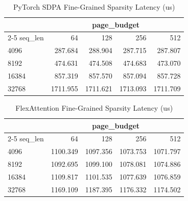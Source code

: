\begin{table}[hbt]
\small
\centering
\caption{PyTorch SDPA Fine-Grained Sparsity Latency (us)}
\label{table:eval-sparsity-torch}
\begin{tabular}{@{}lrrrr@{}}
\toprule
\multicolumn{1}{c}{} & \multicolumn{4}{c}{page\_budget} \\
\cmidrule(l){2-5}
seq\_len & 64 & 128 & 256 & 512 \\
\midrule
4096  & 287.684 & 288.904 & 287.715 & 287.807 \\
8192  & 474.631 & 474.508 & 474.683 & 473.070 \\
16384 & 857.319 & 857.570 & 857.094 & 857.728 \\
32768 & 1711.955 & 1711.621 & 1713.093 & 1711.709 \\
\bottomrule
\end{tabular}
\end{table}

\begin{table}[hbt]
\small
\centering
\caption{FlexAttention Fine-Grained Sparsity Latency (us)}
\label{table:eval-sparsity-flexattention}
\begin{tabular}{@{}lrrrr@{}}
\toprule
\multicolumn{1}{c}{} & \multicolumn{4}{c}{page\_budget} \\
\cmidrule(l){2-5}
seq\_len & 64 & 128 & 256 & 512 \\
\midrule
4096  & 1100.349 & 1097.356 & 1073.753 & 1071.797 \\
8192  & 1092.695 & 1099.100 & 1078.081 & 1074.886 \\
16384 & 1109.817 & 1101.535 & 1077.639 & 1076.859 \\
32768 & 1169.109 & 1187.395 & 1176.332 & 1174.502 \\
\bottomrule
\end{tabular}
\end{table}